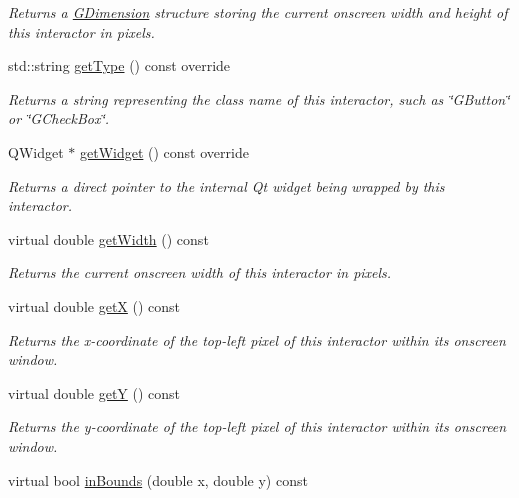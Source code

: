 \begin{DoxyCompactItemize}
\begin{DoxyCompactList}\small\item\em Returns a \mbox{\hyperlink{structGDimension}{G\+Dimension}} structure storing the current onscreen width and height of this interactor in pixels. \end{DoxyCompactList}\item 
std\+::string \mbox{\hyperlink{classGCanvas_a9b72ede4ee8520f987a0c01e30654814}{get\+Type}} () const override
\begin{DoxyCompactList}\small\item\em Returns a string representing the class name of this interactor, such as \char`\"{}\+G\+Button\char`\"{} or \char`\"{}\+G\+Check\+Box\char`\"{}. \end{DoxyCompactList}\item 
Q\+Widget $\ast$ \mbox{\hyperlink{classGCanvas_a3b33a602b31a6b809d020535a59db3b4}{get\+Widget}} () const override
\begin{DoxyCompactList}\small\item\em Returns a direct pointer to the internal Qt widget being wrapped by this interactor. \end{DoxyCompactList}\item 
virtual double \mbox{\hyperlink{classGInteractor_a0ed2965abd4f5701d2cadf71239faf19}{get\+Width}} () const
\begin{DoxyCompactList}\small\item\em Returns the current onscreen width of this interactor in pixels. \end{DoxyCompactList}\item 
virtual double \mbox{\hyperlink{classGInteractor_a344385751bee0720059403940d57a13e}{getX}} () const
\begin{DoxyCompactList}\small\item\em Returns the x-\/coordinate of the top-\/left pixel of this interactor within its onscreen window. \end{DoxyCompactList}\item 
virtual double \mbox{\hyperlink{classGInteractor_aafa51c7f8f38a09febbb9ce7853f77b4}{getY}} () const
\begin{DoxyCompactList}\small\item\em Returns the y-\/coordinate of the top-\/left pixel of this interactor within its onscreen window. \end{DoxyCompactList}\item 
virtual bool \mbox{\hyperlink{classGInteractor_afc480f652b8c5f1fb255e2269ce68879}{in\+Bounds}} (double x, double y) const

\end{DoxyCompactItemize}
